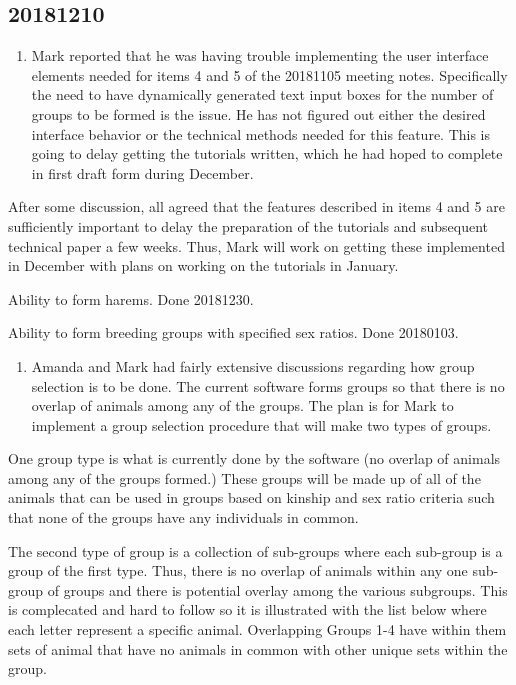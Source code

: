 \documentclass[
]{article}
\providecommand{\tightlist}{%
  \setlength{\itemsep}{0pt}\setlength{\parskip}{0pt}}
\begin{document}
\hypertarget{section-17}{%
\subsection{20181210}\label{section-17}}

\begin{enumerate}
\def\labelenumi{\arabic{enumi}.}
\tightlist
\item
  Mark reported that he was having trouble implementing the user
  interface elements needed for items 4 and 5 of the 20181105 meeting
  notes. Specifically the need to have dynamically generated text input
  boxes for the number of groups to be formed is the issue. He has not
  figured out either the desired interface behavior or the technical
  methods needed for this feature. This is going to delay getting the
  tutorials written, which he had hoped to complete in first draft form
  during December.
\end{enumerate}

After some discussion, all agreed that the features described in items 4
and 5 are sufficiently important to delay the preparation of the
tutorials and subsequent technical paper a few weeks. Thus, Mark will
work on getting these implemented in December with plans on working on
the tutorials in January.

Ability to form harems. Done 20181230.

Ability to form breeding groups with specified sex ratios. Done
20180103.

\begin{enumerate}
\def\labelenumi{\arabic{enumi}.}
\tightlist
\item
  Amanda and Mark had fairly extensive discussions regarding how group
  selection is to be done. The current software forms groups so that
  there is no overlap of animals among any of the groups. The plan is
  for Mark to implement a group selection procedure that will make two
  types of groups.
\end{enumerate}

One group type is what is currently done by the software (no overlap of
animals among any of the groups formed.) These groups will be made up of
all of the animals that can be used in groups based on kinship and sex
ratio criteria such that none of the groups have any individuals in
common.

The second type of group is a collection of sub-groups where each
sub-group is a group of the first type. Thus, there is no overlap of
animals within any one sub-group of groups and there is potential
overlay among the various subgroups. This is complecated and hard to
follow so it is illustrated with the list below where each letter
represent a specific animal. Overlapping Groups 1-4 have within them
sets of animal that have no animals in common with other unique sets
within the group.
\end{document}
